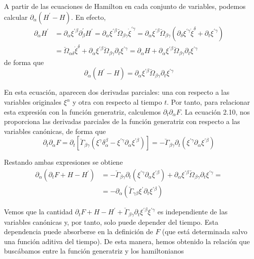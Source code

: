 A partir de las ecuaciones de Hamilton en cada conjunto de variables, podemos calcular $\partial_{\alpha}\left(H^{\prime}-H\right)$. En efecto,
$$
\begin{aligned}
\partial_{\alpha} H^{\prime} & =\partial_{\alpha} \xi^{\prime \beta} \partial_{\beta}^{\prime} H^{\prime}=\partial_{\alpha} \xi^{\prime \beta} \breve{\Omega}_{\beta \gamma} \dot{\xi}^{\prime \gamma}=\partial_{\alpha} \xi^{\prime \beta} \breve{\Omega}_{\beta \gamma}\left(\partial_{\delta} \xi^{\prime \gamma} \dot{\xi}^{\delta}+\partial_{t} \xi^{\prime \gamma}\right) \\
& =\breve{\Omega}_{\alpha \delta} \dot{\xi}^{\delta}+\partial_{\alpha} \xi^{\prime \beta} \breve{\Omega}_{\beta \gamma} \partial_{t} \xi^{\prime \gamma}=\partial_{\alpha} H+\partial_{\alpha} \xi^{\prime \beta} \breve{\Omega}_{\beta \gamma} \partial_{t} \xi^{\prime \gamma}
\end{aligned}
$$
de forma que
$$
\partial_{\alpha}\left(H^{\prime}-H\right)=\partial_{\alpha} \xi^{\prime \beta} \breve{\Omega}_{\beta \gamma} \partial_{t} \xi^{\prime \gamma}
$$

En esta ecuación, aparecen dos derivadas parciales: una con respecto a las variables originales $\xi^{\alpha}$ y otra con respecto al tiempo $t$. Por tanto, para relacionar esta expresión con la función generatriz, calculemos $\partial_{t} \partial_{\alpha} F$. La ecuación 2.10, nos proporciona las derivadas parciales de la función generatriz con respecto a las variables canónicas, de forma que
$$
\partial_{t} \partial_{\alpha} F=\partial_{t}\left[\breve{\Gamma}_{\beta \gamma}\left(\xi^{\gamma} \delta_{\alpha}^{\beta}-\xi^{\prime \gamma} \partial_{\alpha} \xi^{\prime \beta}\right)\right]=-\breve{\Gamma}_{\beta \gamma} \partial_{t}\left(\xi^{\prime \gamma} \partial_{\alpha} \xi^{\prime \beta}\right)
$$

Restando ambas expresiones se obtiene 
$$
\begin{aligned}
\partial_{\alpha}\left(\partial_{t} F+H-H^{\prime}\right) & =-\breve{\Gamma}_{\beta \gamma} \partial_{t}\left(\xi^{\prime \gamma} \partial_{\alpha} \xi^{\prime \beta}\right)+\partial_{\alpha} \xi^{\prime \beta} \breve{\Omega}_{\beta \gamma} \partial_{t} \xi^{\prime \gamma}= \\
& =-\partial_{\alpha}\left(\breve{\Gamma}_{\gamma \beta} \xi^{\prime} \partial_{t} \xi^{\prime \beta}\right)
\end{aligned}
$$

Vemos que la cantidad $\partial_{t} F+H-H^{\prime}+\breve{\Gamma}_{\beta \gamma} \partial_{t} \xi^{\prime \beta} \xi^{\prime \gamma}$ es independiente de las variables canónicas y, por tanto, solo puede depender del tiempo. Esta dependencia puede absorberse en la definición de $F$ (que está determinada salvo una función aditiva del tiempo). De esta manera, hemos obtenido la relación que buscábamos entre la función generatriz y los hamiltonianos

